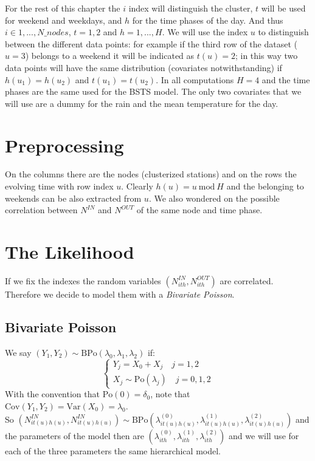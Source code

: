 \documentclass[11pt,twoside]{report}
\begin{document}
\vspace{2mm}

For the rest of this chapter the $i$ index will distinguish the cluster, $t$ will be used for weekend and weekdays, and $h$ for the time phases of the day. And thus $i \in 1,...,N\_nodes$, $t = 1,2$ and $h = 1,...,H$. We will use the index $u$ to distinguish between the different data points: for example if the third row of the dataset ($u=3$) belongs to a weekend it will be indicated as $t(u)=2$; in this way two data points will have the same distribution (covariates notwithstanding) if $h(u_1) = h(u_2)$ and $t(u_1)=t(u_2)$. In all computations $H=4$ and the time phases are the same used for the BSTS model. The only two covariates that we will use are a dummy for the rain and the mean temperature for the day.
\section{Preprocessing}
On the columns there are the nodes (clusterized stations) and on the rows the evolving time with row index $u$. Clearly $h(u) = u \ \mathrm{mod}\ H$ and the belonging to weekends can be also extracted from $u$. We also wondered on the possible correlation between $N^{IN}$ and $N^{OUT}$ of the same node and time phase. 

\section{The Likelihood}
If we fix the indexes the random variables $(N^{IN}_{ith}, N^{OUT}_{ith})$ are	correlated. Therefore we decide to model them with a \emph{Bivariate Poisson}.
\subsection{Bivariate Poisson}
We say $(Y_1,Y_2) \sim \mathrm{BPo}(\lambda_0, \lambda_1, \lambda_2)$ if:
\begin{equation}
\begin{cases}
Y_j = X_0 + X_j \quad j = 1,2\\
X_j \sim \mathrm{Po}(\lambda_j) \quad j = 0,1,2
\end{cases}
\end{equation}
With the convention that $\mathrm{Po}(0) = \delta_0$, note that $\mathrm{Cov}(Y_1, Y_2) = \mathrm{Var}(X_0) = \lambda_0$.\\
 So $(N^{IN}_{it(u)h(u)}, N^{IN}_{it(u)h(u)}) \sim \mathrm{BPo}(\lambda^{(0)}_{it(u)h(u)}, \lambda^{(1)}_{it(u)h(u)}, \lambda^{(2)}_{it(u)h(u)})$ and the parameters of the model then are $(\lambda^{(0)}_{ith}, \lambda^{(1)}_{ith}, \lambda^{(2)}_{ith})$ and we will use for each of the three parameters the same hierarchical model.
\end{document}
